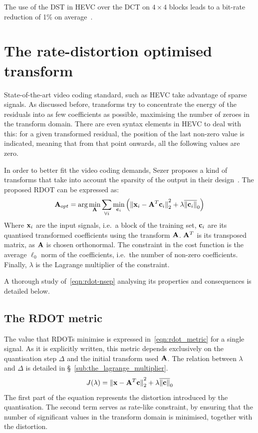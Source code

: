 \documentclass[11pt,a4paper,openright,twoside]{book}
\numberwithin{equation}{section} %
\begin{document}
The use of the \ac{DST} in \ac{HEVC} over the \ac{DCT} on $4\times4$
blocks leads to a bit-rate reduction of 1\% on
average~\cite{sullivan-12-overview-hevc}.

\section{The rate-distortion optimised transform}
\label{sec:the_rate_distortion_optimised_transform}

State-of-the-art video coding standard, such as \ac{HEVC} take advantage
of sparse signals.
As discussed before, transforms try to concentrate the energy of the
residuals into as few coefficients as possible, maximising the number of
zeroes in the transform domain.
There are even syntax elements in \ac{HEVC} to deal with this:
for a given transformed residual, the position of the last non-zero
value is indicated, meaning that from that point onwards, all the
following values are zero.

In order to better fit the video coding demands, Sezer proposes a kind
of transforms that take into account the sparsity of the output in their
design~\cite{sezer-11-phd}.
The proposed \ac{RDOT} can be expressed as:
\begin{equation}
	\mathbf{A}_{opt} = \text{arg}\min\limits_{\mathbf{A}}
	\sum_{\forall i} \min\limits_{\mathbf{c}_i}
	\left(
	{\Vert \mathbf{x}_i - \mathbf{A}^T\mathbf{c}_i \Vert}_2^2 + \lambda\overline{\Vert \mathbf{c}_i \Vert}_0
	\right)
	\label{eqn:rdot-nsep}
\end{equation}
Where $\mathbf{x}_i$ are the input signals, i.e.\ a block of the training set,
$\mathbf{c}_i$ are its quantised transformed coefficients using the transform
$\mathbf{A}$.
$\mathbf{A}^T$ is its transposed matrix, as $\mathbf{A}$ is chosen orthonormal.
The constraint in the cost function is the average $\ell_0$ norm of the
coefficients, i.e.\ the number of non-zero coefficients.
Finally, $\lambda$ is the Lagrange multiplier of the constraint.

A thorough study of~\eqref{eqn:rdot-nsep} analysing its properties and
consequences is detailed below.

\subsection{The \acs{RDOT} metric}
\label{sub:the_rdot_metric}

The value that \acp{RDOT} minimise is expressed
in~\eqref{eqn:rdot_metric} for a single signal.
As it is explicitly written, this metric depends exclusively on the
quantisation step $\Delta$ and the initial transform used $\mathbf{A}$.
The relation between $\lambda$ and $\Delta$ is detailed in
\S~\ref{sub:the_lagrange_multiplier}.
\begin{equation}
	J (\lambda) =
	{\Vert \mathbf{x} - \mathbf{A}^T \mathbf{c} \Vert}_2^2 + \lambda\overline{\Vert \mathbf{c} \Vert}_0
	\label{eqn:rdot_metric}
\end{equation}
The first part of the equation represents the distortion introduced by
the quantisation.
The second term serves as rate-like constraint, by ensuring that the
number of significant values in the transform domain is minimised,
together with the distortion.
\end{document}
